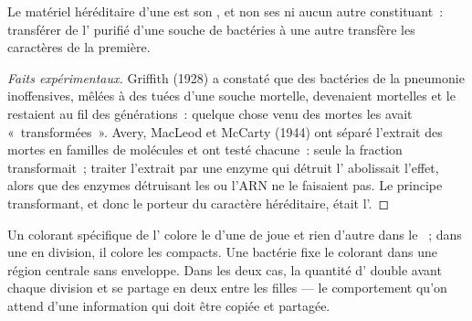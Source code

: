 \begin{proposition}\label{prop:g10:universal-dna:material}
Le matériel héréditaire d'une  est son , et non ses 
ni aucun autre constituant~: transférer de l' purifié d'une souche
de bactéries à une autre transfère les caractères de la première.
\end{proposition}
\begin{proof}[Faits expérimentaux]
Griffith (1928) a constaté que des bactéries de la pneumonie
inoffensives, mêlées à des  tuées d'une souche mortelle,
devenaient mortelles et le restaient au fil des générations~: quelque
chose venu des  mortes les avait «~transformées~». Avery,
MacLeod et McCarty (1944) ont séparé l'extrait des  mortes en
familles de molécules et ont testé chacune~: seule la fraction 
transformait~; traiter l'extrait par une enzyme qui détruit l'
abolissait l'effet, alors que des enzymes détruisant les  ou
l'ARN ne le faisaient pas. Le principe transformant, et donc le porteur
du caractère héréditaire, était l'.
\end{proof}

\begin{example}\label{ex:g10:universal-dna:where}
Un colorant spécifique de l' colore le  d'une  de joue
et rien d'autre dans le ~; dans une  en division, il
colore les  compacts. Une bactérie fixe le colorant dans une
région centrale sans enveloppe. Dans les deux cas, la quantité d'
double avant chaque division et se partage en deux entre les 
filles --- le comportement qu'on attend d'une information qui doit être
copiée et partagée.
\end{example}

